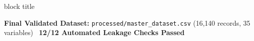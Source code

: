 \documentclass[aspectratio=169, 10pt]{beamer}
\newenvironment{highlightcard}[1][]{%
        \begin{beamercolorbox}[rounded=true,shadow=false,wd=\linewidth,sep=3.5pt,#1]{block title}%
        \fontsize{7.8pt}{9.8pt}\selectfont%
    }{%
        \end{beamercolorbox}%
    }
\begin{document}
\begin{frame}[t]
\begin{table}[h]
        \end{table}                                                                                                                                                                                    
        \vspace{-0.15cm}                                                                                                                                                                               
        \begin{highlightcard}                                                                                                                                                                          
            \centering\scriptsize                                                                                                                                                                      
            \textbf{Final Validated Dataset:} \texttt{processed/master\_dataset.csv} (16,140 records, 35 variables) \textbullet\ \textbf{12/12 Automated Leakage Checks Passed}                        
        \end{highlightcard}                                                                                                                                                                            
    \end{frame}                                                                                                                                                                                        
                                                                                                                                                                                                       
\end{document}
